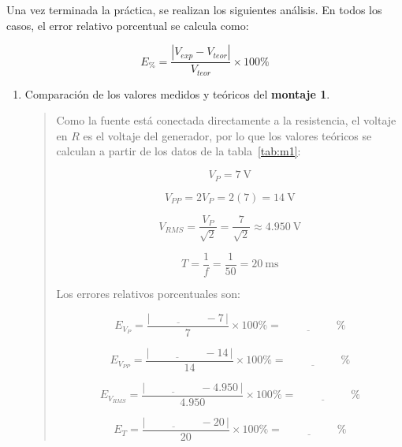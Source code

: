 \documentclass{article}
\newcommand{\vacio}[1][2cm]{\underline{\hspace{#1}}}
\begin{document}
    Una vez terminada la práctica, se realizan los siguientes análisis. En todos los casos, el error relativo porcentual se calcula como:

    \[
        E_{\%} = \frac{\left|V_{exp} - V_{teor}\right|}{V_{teor}} \times 100\%
    \]

    \begin{enumerate}
        \item Comparación de los valores medidos y teóricos del \textbf{montaje 1}.

        \begin{quote}
            Como la fuente está conectada directamente a la resistencia, el voltaje en $R$ es el voltaje del generador, por lo que los valores teóricos se calculan a partir de los datos de la tabla~\ref{tab:m1}:

            \[
                V_P = \SI{7}{\volt}
            \]

            \[
                V_{PP} = 2V_P = 2(7) = \SI{14}{\volt}
            \]

            \[
                V_{RMS} = \frac{V_P}{\sqrt{2}} = \frac{7}{\sqrt{2}} \approx \SI{4.950}{\volt}
            \]

            \[
                T = \frac{1}{f} = \frac{1}{50} = \SI{20}{\milli\second}
            \]

            Los errores relativos porcentuales son:

            \[
                E_{V_P} = \frac{\left|\,\vacio - 7\,\right|}{7} \times 100\% = \vacio\,\%
            \]

            \[
                E_{V_{PP}} = \frac{\left|\,\vacio - 14\,\right|}{14} \times 100\% = \vacio\,\%
            \]

            \[
                E_{V_{RMS}} = \frac{\left|\,\vacio - 4.950\,\right|}{4.950} \times 100\% = \vacio\,\%
            \]

            \[
                E_{T} = \frac{\left|\,\vacio - 20\,\right|}{20} \times 100\% = \vacio\,\%
            \]
        \end{quote}


\end{enumerate}
\end{document}
